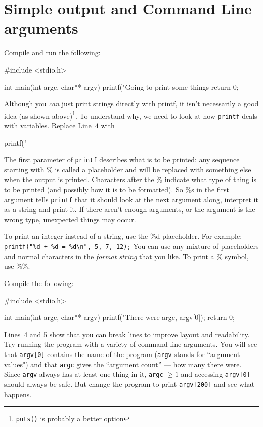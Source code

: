 
\chapter{Simple output and Command Line arguments}


Compile and run the following:
\begin{codeblock}
#include <stdio.h>

int main(int argc, char** argv) {
    printf("Going to print some things %
    return 0;
}
\end{codeblock}

Although you \emph{can} just print strings directly with printf, it isn't necessarily a good idea (as shown above)\footnote{\texttt{puts()} is probably a better option}.
To understand why, we need to look at how \texttt{printf} deals with variables.
Replace Line~$4$ with
\begin{codeinline}
printf("%
\end{codeinline}

The first parameter of \texttt{printf} describes what is to be printed: any sequence starting with \% is called a placeholder and will be replaced with something else when the output is printed.
Characters after the \% indicate what type of thing is to be printed (and possibly how it is to be formatted).
So \%s in the first argument tells \texttt{printf} that it should look at the next argument along, interpret it as a string and print it.
If there aren't enough arguments, or the argument is the wrong type, unexpected things may occur.

To print an integer instead of a string, use the \%d placeholder.
For example: \lstinline!printf("%d + %d = %d\n", 5, 7, 12);!
You can use any mixture of placeholders and normal characters in the \emph{format string} that you like.
To print a \% symbol, use \%\%.


Compile the following:
\begin{codeblock}
#include <stdio.h>

int main(int argc, char** argv) {
    printf("There were %
      argc, argv[0]);
    return 0;
}
\end{codeblock}
Lines~4 and 5 show that you can break lines to improve layout and readability.
Try running the program with a variety of command line arguments.
You will see that \texttt{argv[0]} contains the name of the program (\texttt{argv} stands for ``argument values") and that \texttt{argc} gives the ``argument count'' --- how many there were.
Since \texttt{argv} always has at least one thing in it, \texttt{argc} $\geq 1$ and accessing \texttt{argv[0]} should always be safe.
But change the program to print \texttt{argv[200]} and see what happens.


